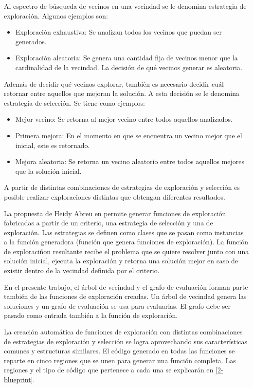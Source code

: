 Al espectro de búsqueda de vecinos en una vecindad se le denomina estrategia de exploración. Algunos ejemplos son:

\begin{itemize}
	\item Exploración exhaustiva: Se analizan todos los vecinos que puedan ser generados.
	\item Exploración aleatoria: Se genera una cantidad fija de vecinos menor que la cardinalidad de la vecindad. La decisión de qué vecinos generar es aleatoria.
\end{itemize}

Además de decidir qué vecinos explorar, también es necesario decidir cuál retornar entre aquellos que mejoran la solución. A esta decisión se le denomina estrategia de selección. Se tiene como ejemplos:

\begin{itemize}
	\item Mejor vecino: Se retorna al mejor vecino entre todos aquellos analizados.
	\item Primera mejora: En el momento en que se encuentra un vecino mejor que el inicial, este es retornado.
	\item Mejora aleatoria: Se retorna un vecino aleatorio entre todos aquellos mejores que la solución inicial.
\end{itemize}

A partir de distintas combinaciones de estrategias de exploración y selección es posible realizar exploraciones distintas que obtengan diferentes resultados.

La propuesta de Heidy Abreu en \cite{Heidy} permite generar funciones de exploración fabricadas a partir de un criterio, una estrategia de selección y una de exploración. Las estrategias se definen como clases que se pasan como instancias a la función generadora (función que genera funciones de exploración). La función de exploraciñon resultante recibe el problema que se quiere resolver junto con una solución inicial, ejecuta la exploración y retorna una solución mejor en caso de existir dentro de la vecindad definida por el criterio. 

En el presente trabajo, el árbol de vecindad y el grafo de evaluación forman parte también de las funciones de exploración creadas. Un árbol de vecindad genera las soluciones y un grafo de evaluación se usa para evaluarlas. El grafo debe ser pasado como entrada también a la función de exploración.

La creación automática de funciones de exploración con distintas combinaciones de estrategias de exploración y selección se logra aprovechando sus características comunes y estructuras similares. El código generado en todas las funciones se reparte en cinco regiones que se  unen para generar una función completa. Las regiones y el tipo de código que pertenece a cada una se explicarán en \ref{2-blueprint}.

